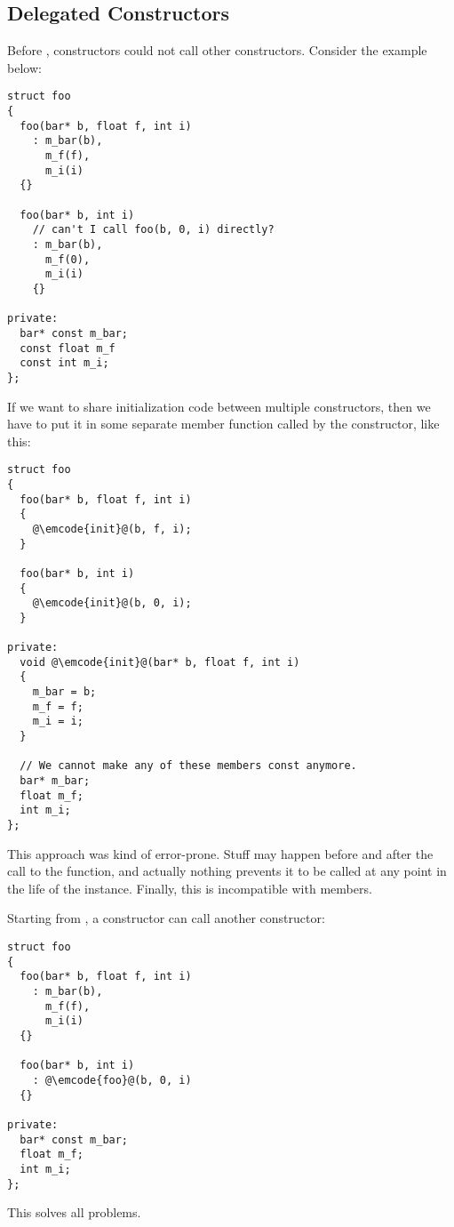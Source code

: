 \subsection{Delegated Constructors}

Before , constructors could not call other
constructors. Consider the example below:

\begin{lstlisting}
struct foo
{
  foo(bar* b, float f, int i)
    : m_bar(b),
      m_f(f),
      m_i(i)
  {}

  foo(bar* b, int i)
    // can't I call foo(b, 0, i) directly?
    : m_bar(b),
      m_f(0),
      m_i(i)
    {}

private:
  bar* const m_bar;
  const float m_f
  const int m_i;
};
\end{lstlisting}

If we want to share initialization code between multiple constructors,
then we have to put it in some separate member function called by the
constructor, like this:

\begin{lstlisting}
struct foo
{
  foo(bar* b, float f, int i)
  {
    @\emcode{init}@(b, f, i);
  }

  foo(bar* b, int i)
  {
    @\emcode{init}@(b, 0, i);
  }

private:
  void @\emcode{init}@(bar* b, float f, int i)
  {
    m_bar = b;
    m_f = f;
    m_i = i;
  }

  // We cannot make any of these members const anymore.
  bar* m_bar;
  float m_f;
  int m_i;
};
\end{lstlisting}

This approach was kind of error-prone. Stuff may happen before and
after the call to the  function, and actually nothing
prevents it to be called at any point in the life of the
instance. Finally, this is incompatible with  members.

\bigskip

Starting from , a constructor can call another constructor:

\begin{lstlisting}
struct foo
{
  foo(bar* b, float f, int i)
    : m_bar(b),
      m_f(f),
      m_i(i)
  {}

  foo(bar* b, int i)
    : @\emcode{foo}@(b, 0, i)
  {}

private:
  bar* const m_bar;
  float m_f;
  int m_i;
};
\end{lstlisting}

This solves all problems.
